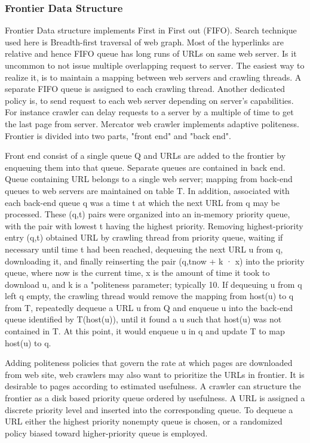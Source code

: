 \documentclass[article,type=msc,colorback,accentcolor=tud9c,twoside,11pt]{tudthesis}
\begin{document}
\subsubsection{Frontier Data Structure}
 Frontier \cite{frontierdatastructures} Data structure implements First in First out (FIFO).  Search technique used here is Breadth-first traversal of web graph. Most of the hyperlinks are relative and hence FIFO queue has long runs of URLs on same web server. Is it uncommon to not issue multiple overlapping request to server. The easiest way to realize it, is to maintain a mapping between web servers and crawling threads. A separate FIFO queue is assigned to each crawling thread. Another dedicated policy is, to send request to each web server depending on server's capabilities. For instance crawler can delay requests to a server by a multiple of time to get the last page from server. Mercator web crawler implements adaptive politeness. Frontier is divided into two parts, "front end" and "back end".

Front end consist of a single queue Q and URLs are added to the frontier by enqueuing them into that queue. Separate queues are contained in back end. Queue containing URL belongs to a single web server; mapping from back-end queues to web servers are maintained on table T. In addition, associated with each back-end queue q was a time t at which the next URL from q may be processed. These (q,t) pairs were organized into an in-memory priority queue, with the pair with lowest t having the highest priority.  Removing highest-priority entry (q,t) obtained URL by crawling thread from priority queue, waiting if necessary until time t had been reached, dequeuing the next URL u from q, downloading it, and finally reinserting the pair (q,tnow + k · x) into the priority queue, where now is the current time, x is the amount of time it took to download u, and k is a "politeness parameter; typically 10. If dequeuing u from q left q empty, the crawling thread would remove the mapping from host(u) to q from T, repeatedly dequeue a URL u from Q and enqueue u into the back-end queue identified by T(host(u)), until it found a u such that host(u) was not contained in T. At this point, it would enqueue u in q and update T to map host(u) to q.

Adding politeness policies that govern the rate at which pages are downloaded from web site, web crawlers may also want to prioritize the URLs in  frontier. It is desirable to pages according to estimated usefulness. A crawler can structure the frontier as a disk based priority queue ordered by usefulness. A URL is assigned a discrete priority level and inserted into the corresponding queue. To dequeue a URL either the highest priority nonempty queue is chosen, or a randomized policy biased toward higher-priority queue is employed.
\end{document}
